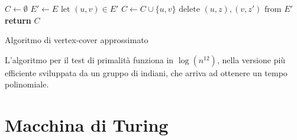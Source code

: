 \documentclass[a4paper,12pt, oneside]{book}
\begin{document}
\begin{algorithm}
  \begin{algorithmic}
    \State $C\gets\emptyset$
    \State $E'\gets E$
    \State $\mbox{let }(u,v)\in E'$
    \State $C\gets C\cup \{u,v\}$
    \State $\mbox{delete } (u,z),(v,z') \mbox{ from } E'$
    \EndFor
    \EndWhile
    \State \textbf{return} $C$
    \EndFunction
  \end{algorithmic}
  \caption{Algoritmo di vertex-cover approssimato}
\end{algorithm}
\newpage
\begin{shaded}
  L'algoritmo per il test di primalità funziona in $\log (n^{12})$, nella
  versione più efficiente sviluppata da un gruppo di indiani, che arriva ad
  ottenere un tempo polinomiale.
\end{shaded}
\chapter{Macchina di Turing}
\end{document}
